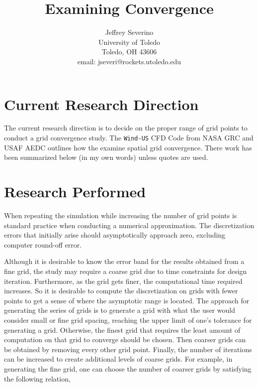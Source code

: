 \documentclass[a4paper]{article}
\begin{document}
\begin{titlepage}

    \title{
    Examining Convergence}

    \author{ Jeffrey Severino \\
        University of Toledo \\
        Toledo, OH  43606 \\
    email: jseveri@rockets.utoledo.edu}


    \maketitle

\end{titlepage}
\section{Current Research Direction}
The current research direction is to decide on the proper range of grid points to
conduct a grid convergence study. The \verb|Wind-US| CFD Code from NASA GRC and USAF
AEDC outlines how the examine spatial grid convergence. There work has been summarized below (in my own words)
unless quotes are used.
\section{Research Performed}
When repeating the simulation while increasing the number of grid points is standard 
practice when conducting a numerical approximation. The discretization errors that
initially arise should asymptotically approach zero, excluding computer round-off error. 

Although it is desirable to know the error band for the results obtained from a 
fine grid, the study may require a coarse grid due to time constraints for design
iteration. Furthermore, as the grid gets finer, the computational time required 
increases. So it is desirable to compute the discretization on grids with fewer points
to get a sense of where the asymptotic range is located. The approach for generating
the series of grids is to generate a grid with what the user would consider small or
fine grid spacing, reaching the upper limit of one's tolerance for generating a grid. Otherwise, the finest grid that requires the least amount of computation on that grid to converge should be chosen. Then coarser grids can be obtained by removing every other grid point. Finally, the
number of iterations can be increased to create additional levels of coarse grids.
For example, in generating the fine grid, one can choose the number of coarser grids
by satisfying the following relation,
\end{document}
